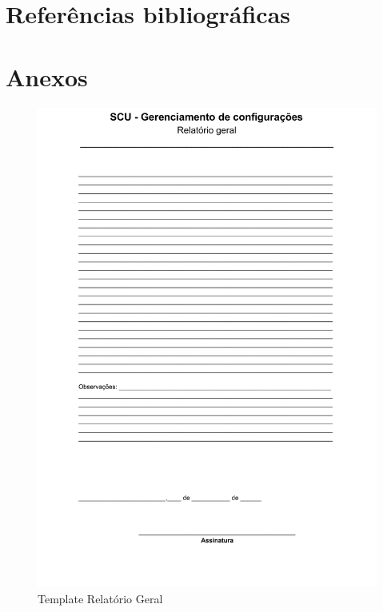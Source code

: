 \documentclass[	DIV=calc,%
							paper=a4,%
							fontsize=12pt,%
							onecolumn]{scrartcl}%
\begin{document}
\section{Referências bibliográficas}
\renewcommand\refname{} %

  

\section{Anexos}
\begin{figure}
\centering
\includegraphics[width=\textwidth]{templateRel.pdf}
\caption{Template Relatório Geral}
\label{relatorioGeral}
\end{figure}
\FloatBarrier
\end{document}
